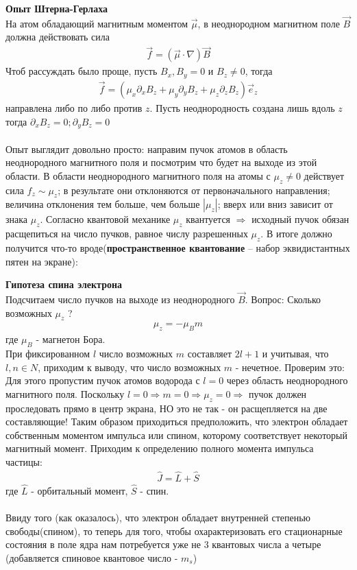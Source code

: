 \documentclass[__main__.tex]{subfiles}
\begin{document}
\textbf{Опыт Штерна-Герлаха}\\
На атом обладающий магнитным моментом $\vec{\mu}$, в неоднородном магнитном поле $\vec{B}$ должна действовать сила
\begin{gather*}
	\vec{f} = \left(\vec{\mu}\cdot\nabla\right)\vec{B}
\end{gather*}
Чтоб рассуждать было проще, пусть $B_x, B_y = 0$  и $B_z \neq 0$, тогда
\begin{gather*}
	\vec{f} = \left(\mu_x\partial_xB_z+\mu_y\partial_yB_z+\mu_z\partial_zB_z\right)\vec{e}_z
\end{gather*}
направлена либо по либо против $z$. Пусть неоднородность создана лишь вдоль $z$ тогда $\partial_xB_z=0; \partial_yB_z=0$\\\\
Опыт выглядит довольно просто: направим пучок атомов в область неоднородного магнитного поля и посмотрим что будет на выходе из этой области.
В области неоднородного магнитного поля на атомы с $\mu_z \neq 0$ действует сила $f_z \sim \mu_z$; в результате они отклоняются от первоначального направления; величина отклонения тем больше, чем больше $|\mu_z|$; вверх или вниз зависит от знака $\mu_z$.
Согласно квантовой механике $\mu_z$ квантуется $\Rightarrow$ исходный пучок обязан расщепиться на число пучков, равное числу разрешенных $\mu_z$. В итоге должно получится что-то вроде(\textbf{пространственное квантование} -- набор эквидистантных пятен на экране):
\newpage
\begin{figure}[h]
	\center{\texttt{[image: ch-18]}}
\end{figure}

\textbf{Гипотеза спина электрона}\\
Подсчитаем число пучков на выходе из неоднородного $\vec{B}$. Вопрос: Сколько возможных $\mu_z$ ?
\begin{gather*}
	\mu_z = -\mu_Bm
\end{gather*}
где $\mu_B$ - магнетон Бора.\\
При фиксированном $l$ число возможных $m$ составляет $2l+1$ и учитывая, что $l,n \in N$, приходим к выводу, что число возможных $m$ - нечетное. Проверим это:\\
Для этого пропустим пучок атомов водорода с $l=0$ через область неоднородного магнитного поля. Поскольку $l = 0 \Rightarrow m = 0 \Rightarrow \mu_z = 0 \Rightarrow$ пучок должен проследовать прямо в центр экрана, НО это не так - он расщепляется на две составляющие! Таким образом приходиться предположить, что электрон обладает собственным моментом импульса или спином, которому соответствует некоторый магнитный момент. Приходим к определению полного момента импульса частицы:
\begin{gather*}
	\hat{J} = \hat{L}+\hat{S}
\end{gather*} 
где $\hat{L}$ - орбитальный момент, $\hat{S}$ - спин.\\\\
Ввиду того (как оказалось), что электрон обладает внутренней степенью свободы(спином), то теперь для того, чтобы охарактеризовать его стационарные состояния в поле ядра нам потребуется уже не 3 квантовых числа а четыре (добавляется спиновое квантовое число - $m_s$)
	
\end{document}
